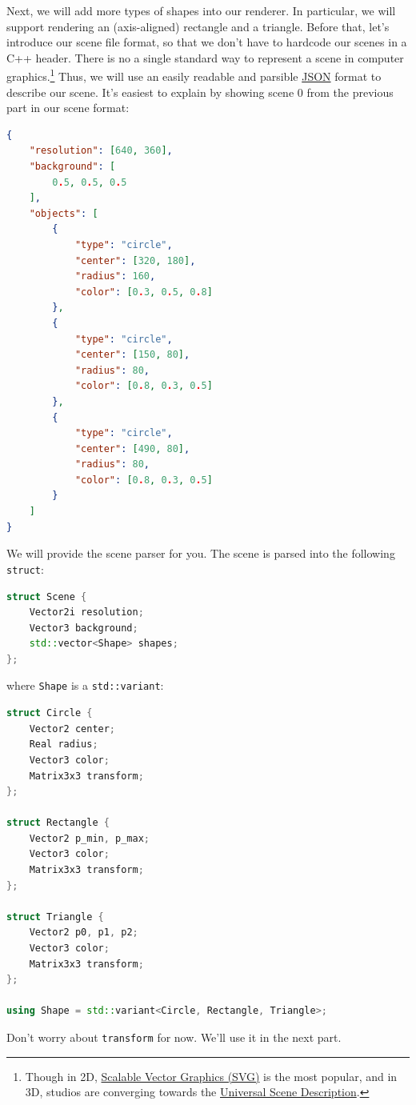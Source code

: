 Next, we will add more types of shapes into our renderer. In particular, we will support rendering an (axis-aligned) rectangle and a triangle. Before that, let's introduce our scene file format, so that we don't have to hardcode our scenes in a C++ header. There is no a single standard way to represent a scene in computer graphics.\footnote{Though in 2D, \href{https://en.wikipedia.org/wiki/SVG}{Scalable Vector Graphics (SVG)} is the most popular, and in 3D, studios are converging towards the \href{https://en.wikipedia.org/wiki/Universal_Scene_Description}{Universal Scene Description}.} Thus, we will use an easily readable and parsible \href{https://en.wikipedia.org/wiki/JSON}{JSON} format to describe our scene. It's easiest to explain by showing scene 0 from the previous part in our scene format:
\begin{lstlisting}[language=json]
{
    "resolution": [640, 360],
    "background": [
        0.5, 0.5, 0.5
    ],
    "objects": [
        {
            "type": "circle",
            "center": [320, 180],
            "radius": 160,
            "color": [0.3, 0.5, 0.8]
        },
        {
            "type": "circle",
            "center": [150, 80],
            "radius": 80,
            "color": [0.8, 0.3, 0.5]
        },
        {
            "type": "circle",
            "center": [490, 80],
            "radius": 80,
            "color": [0.8, 0.3, 0.5]
        }
    ]
}
\end{lstlisting}

We will provide the scene parser for you. The scene is parsed into the following \lstinline{struct}:
\begin{lstlisting}[language=C++]
struct Scene {
    Vector2i resolution;
    Vector3 background;
    std::vector<Shape> shapes;
};
\end{lstlisting}
where \lstinline{Shape} is a \lstinline{std::variant}:
\begin{lstlisting}[language=C++]
struct Circle {
    Vector2 center;
    Real radius;
    Vector3 color;
    Matrix3x3 transform;
};

struct Rectangle {
    Vector2 p_min, p_max;
    Vector3 color;
    Matrix3x3 transform;
};

struct Triangle {
    Vector2 p0, p1, p2;
    Vector3 color;
    Matrix3x3 transform;
};

using Shape = std::variant<Circle, Rectangle, Triangle>;
\end{lstlisting}

Don't worry about \lstinline{transform} for now. We'll use it in the next part.

